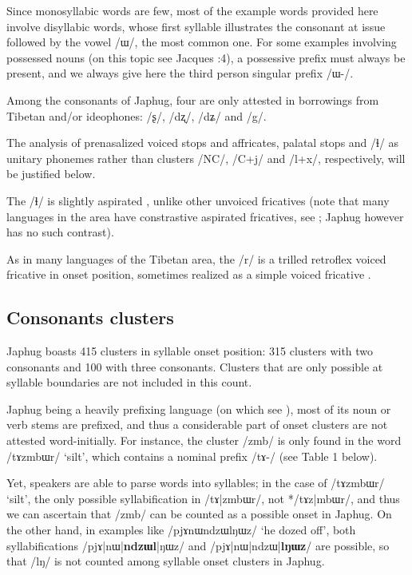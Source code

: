 \documentclass[12pt]{article}
\newcommand{\ipa}[1]{\mbox{\phon/#1/}}
\newcommand{\phonet}[1]{\mbox{\phon[#1]}}
\begin{document}
Since monosyllabic words are few,  most of the example words provided here involve disyllabic words, whose first syllable illustrates the consonant at issue followed by the vowel \ipa{ɯ}, the most common one. For some examples involving possessed nouns (on this topic see Jacques \citeyear{jacques14antipassive}:4), a possessive prefix must always be present, and we always give here the third person singular prefix  \ipa{ɯ-}.
 
Among the consonants of Japhug, four are only attested in borrowings from Tibetan and/or ideophones: \ipa{ʂ}, \ipa{dʐ}, \ipa{dʑ} and \ipa{g}.

The analysis of prenasalized voiced stops and affricates, palatal stops and \ipa{ɬ} as unitary phonemes rather than clusters \ipa{NC}, \ipa{C+j} and \ipa{l+x}, respectively, will be justified  below. 

The \ipa{ɬ} is slightly aspirated \phonet{ɬʰ}, unlike other unvoiced fricatives (note that many languages in the area have constrastive aspirated fricatives, see \citealt{jacques11lingua}; Japhug however has no such contrast).

As in many languages of the Tibetan area, the \ipa{r} is a trilled retroflex voiced fricative \phonet{ɽ͡ʐ} in onset position, sometimes realized as a simple voiced fricative \phonet{ʐ}.

  \subsection*{Consonants clusters} \label{sec:clusters}
  Japhug boasts 415 clusters in syllable onset position:  315 clusters with two consonants and 100 with three consonants. Clusters that are only possible at syllable boundaries are not included in this count. 
  
  Japhug being a heavily prefixing language (on which see \citealt{jacques13harmonization}), most of its noun or verb stems are prefixed, and thus a considerable part of onset clusters are not attested word-initially. For instance, the cluster \ipa{zmb} is only found in the word \ipa{tɤzmbɯr}  `silt', which contains a nominal prefix \ipa{tɤ-} (see Table 1 below). 
  
  Yet, speakers are able to parse words into syllables; in the case of \ipa{tɤzmbɯr}  `silt', the only possible syllabification in \ipa{tɤ|zmbɯr}, not *\ipa{tɤz|mbɯr}, and thus we can ascertain that \ipa{zmb} can be counted as a possible onset in Japhug. On the other hand, in examples like \ipa{pjɤnɯndzɯlŋɯz} `he dozed off', both syllabifications \ipa{pjɤ|nɯ|\textbf{ndzɯl}|ŋɯz} and \ipa{pjɤ|nɯ|ndzɯ|\textbf{lŋɯz}} are possible, so that \ipa{lŋ} is not counted among syllable onset clusters in Japhug.
    
\end{document}
